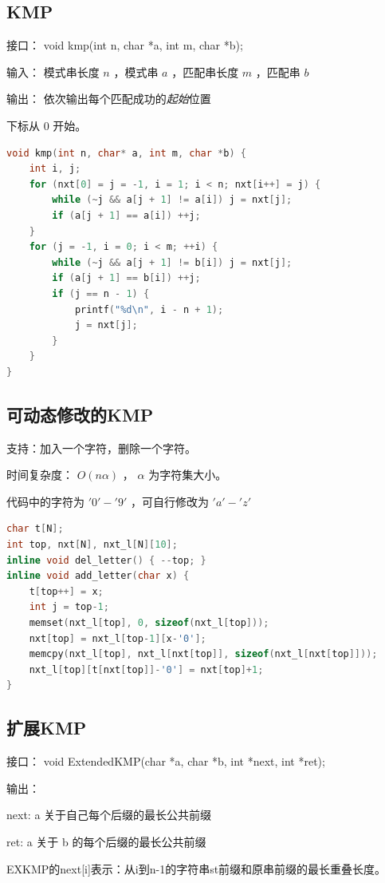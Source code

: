 \documentclass{article}
\begin{document}
\subsection{KMP}
接口： void kmp(int n, char *a, int m, char *b); 

输入： 模式串长度 $n$ ，模式串 $a$ ，匹配串长度 $m$ ，匹配串 $b$

输出： 依次输出每个匹配成功的\emph{起始}位置

下标从 $0$ 开始。

\begin{lstlisting}[language=C++]
void kmp(int n, char* a, int m, char *b) {
    int i, j;
    for (nxt[0] = j = -1, i = 1; i < n; nxt[i++] = j) {
        while (~j && a[j + 1] != a[i]) j = nxt[j];
        if (a[j + 1] == a[i]) ++j;
    }
    for (j = -1, i = 0; i < m; ++i) {
        while (~j && a[j + 1] != b[i]) j = nxt[j];
        if (a[j + 1] == b[i]) ++j;
        if (j == n - 1) {
            printf("%d\n", i - n + 1);
            j = nxt[j];
        }
    }
}
\end{lstlisting}
\subsection{可动态修改的KMP}
支持：加入一个字符，删除一个字符。

时间复杂度： $O(n \alpha)$ ， $\alpha$ 为字符集大小。

代码中的字符为 $'0' - '9'$ ，可自行修改为 $'a' - 'z'$
\begin{lstlisting}[language=C++]
char t[N];
int top, nxt[N], nxt_l[N][10];
inline void del_letter() { --top; }
inline void add_letter(char x) {
	t[top++] = x;
	int j = top-1;
	memset(nxt_l[top], 0, sizeof(nxt_l[top]));
	nxt[top] = nxt_l[top-1][x-'0'];
	memcpy(nxt_l[top], nxt_l[nxt[top]], sizeof(nxt_l[nxt[top]]));
	nxt_l[top][t[nxt[top]]-'0'] = nxt[top]+1;
}
\end{lstlisting}
\subsection{扩展KMP}
接口： void ExtendedKMP(char *a, char *b, int *next, int *ret); 

输出： 

next:  a 关于自己每个后缀的最长公共前缀 

ret: a 关于 b 的每个后缀的最长公共前缀


EXKMP的next[i]表示：从i到n-1的字符串st前缀和原串前缀的最长重叠长度。
\end{document}

